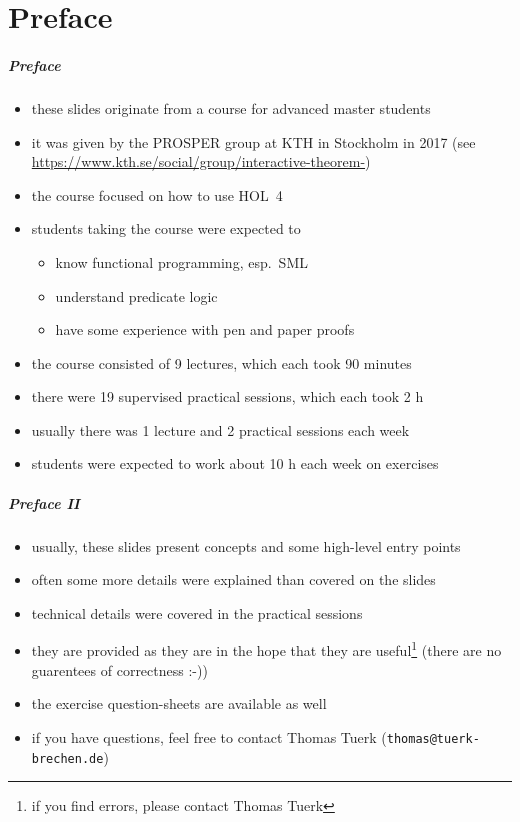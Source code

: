 \part{Preface}

\frame[plain]{\partpage}

\begin{frame}
\frametitle{Preface}
\begin{itemize}
\item these slides originate from a course for advanced master students
\item it was given by the PROSPER group at KTH in Stockholm in 2017 (see \small{\url{https://www.kth.se/social/group/interactive-theorem-}})
\item the course focused on how to use HOL~4
\item students taking the course were expected to 
\begin{itemize}
\item know functional programming, esp.\ SML
\item understand predicate logic
\item have some experience with pen and paper proofs
\end{itemize}
\item the course consisted of 9 lectures, which each took 90 minutes
\item there were 19 supervised practical sessions, which each took 2 h
\item usually there was 1 lecture and 2 practical sessions each week
\item students were expected to work about 10 h each week on exercises 
\end{itemize}
\end{frame}

\begin{frame}
\frametitle{Preface II}
\begin{itemize}
\item usually, these slides present concepts and some high-level entry points
\item often some more details were explained than covered on the slides
\item technical details were covered in the practical sessions
\item they are provided as they are in the hope that they are useful\footnote{if you find errors, please contact Thomas Tuerk} (there are no guarentees of correctness :-))
\item the exercise question-sheets are available as well 
\item if you have questions, feel free to contact Thomas Tuerk (\texttt{thomas@tuerk-brechen.de})
\end{itemize}
\end{frame}


